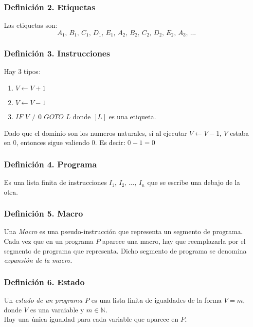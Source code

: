 \documentclass{article}
\newcommand{\comma}{,\,}                                %
\newcommand{\naturales}{\mathbb{N}}                     %
\begin{document}
\subsubsection*{Definición 2. Etiquetas}
Las etiquetas son:
\begin{equation*}
    A_1 \comma B_1 \comma C_1 \comma D_1 \comma E_1 \comma A_2 \comma B_2 \comma C_2 \comma D_2 \comma E_2 \comma A_3 \comma ...
\end{equation*}

\subsubsection*{Definición 3. Instrucciones}
Hay 3 tipos:
\begin{enumerate}
    \item $V \leftarrow V + 1$
    \item $V \leftarrow V - 1$
    \item $IF$ $V \neq 0$ $GOTO$ $L$ donde $[L]$ es una etiqueta.
\end{enumerate}
Dado que el dominio son los numeros naturales, si al ejecutar $V \leftarrow V-1$, $V$ estaba en $0$, entonces sigue valiendo $0$. Es decir: $0 - 1 = 0$

\subsubsection*{Definición 4. Programa}
Es una lista finita de instrucciones $I_1 \comma I_2 \comma ... \comma I_n$ que se escribe una debajo de la otra.

\subsubsection*{Definición 5. Macro}
Una \emph{Macro} es una pseudo-instrucción que representa un segmento de programa.
\\Cada vez que en un programa $P$ aparece una macro, hay que reemplazarla por el segmento de programa que representa. Dicho segmento de programa se denomina \emph{expansión de la macro}.

\subsubsection*{Definición 6. Estado}
Un \emph{estado de un programa $P$} es una lista finita de igualdades de la forma $V = m$, donde $V$ es una varaiable y $m \in \naturales$.
\\Hay una única igualdad para cada variable que aparece en $P$.
\end{document}
